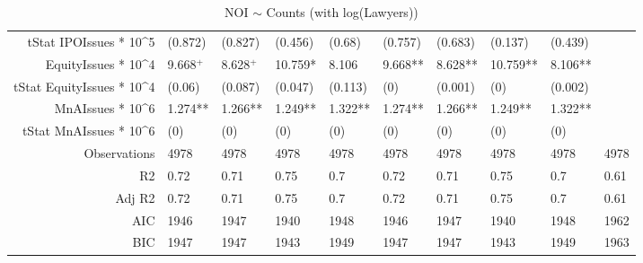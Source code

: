 \begin{table}[ht]
\begin{tabular}{rlllllllll}
  tStat IPOIssues * 10^5 & (0.872) & (0.827) & (0.456) & (0.68) & (0.757) & (0.683) & (0.137) & (0.439) &  \\ 
  EquityIssues * 10^4 & 9.668$^{+}$ & 8.628$^{+}$ & 10.759* & 8.106 & 9.668** & 8.628** & 10.759** & 8.106** &  \\ 
  tStat EquityIssues * 10^4 & (0.06) & (0.087) & (0.047) & (0.113) & (0) & (0.001) & (0) & (0.002) &  \\ 
  MnAIssues * 10^6 & 1.274** & 1.266** & 1.249** & 1.322** & 1.274** & 1.266** & 1.249** & 1.322** &  \\ 
  tStat MnAIssues * 10^6 & (0) & (0) & (0) & (0) & (0) & (0) & (0) & (0) &  \\ 
  Observations & 4978 & 4978 & 4978 & 4978 & 4978 & 4978 & 4978 & 4978 & 4978 \\ 
  R2 & 0.72 & 0.71 & 0.75 & 0.7 & 0.72 & 0.71 & 0.75 & 0.7 & 0.61 \\ 
  Adj R2 & 0.72 & 0.71 & 0.75 & 0.7 & 0.72 & 0.71 & 0.75 & 0.7 & 0.61 \\ 
  AIC & 1946 & 1947 & 1940 & 1948 & 1946 & 1947 & 1940 & 1948 & 1962 \\ 
  BIC & 1947 & 1947 & 1943 & 1949 & 1947 & 1947 & 1943 & 1949 & 1963 \\ 
   \hline
\end{tabular}
\caption{NOI $\sim$ Counts (with log(Lawyers))} 
\end{table}
